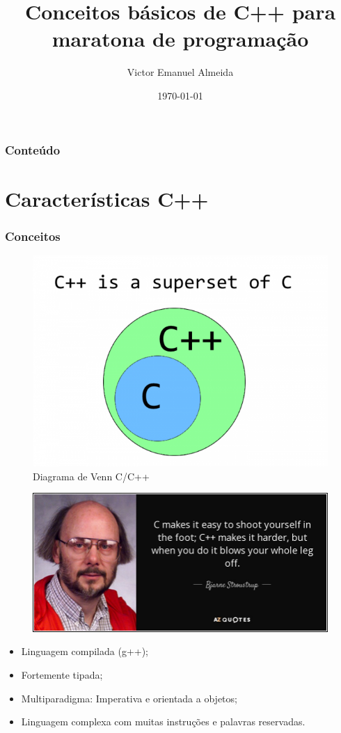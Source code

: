 \documentclass[12pt]{beamer}
\author{Victor Emanuel Almeida}
\title{Conceitos básicos de C++ para maratona de programação}
\date{\today}
\institute{UNIOESTE}
\begin{document}
\frame{\titlepage}

\begin{frame}
    \frametitle{Conteúdo}
    \tableofcontents
\end{frame}

\section{Características C++}\label{Características C++}
\begin{frame}[allowframebreaks]
    \frametitle{Conceitos}
    \begin{figure}[!htb]
        \centering
        \includegraphics[width=.7\textwidth]{superset}
        \caption{\label{fig:superset}Diagrama de Venn C/C++}
    \end{figure}
    \framebreak
    \begin{figure}[!htb]
        \centering
        \includegraphics[width=\textwidth]{frase_c++}
    \end{figure}
    \framebreak
    \begin{itemize}
        \item Linguagem compilada (g++);
        \item Fortemente tipada\cite{slides_clp_2};
        \item Multiparadigma: Imperativa e orientada a objetos\cite{slides_clp_2};
        \item Linguagem complexa com muitas instruções e palavras reservadas\cite{slides_clp_2}.
    \end{itemize}
\end{frame}
\end{document}

